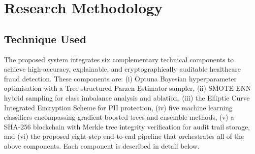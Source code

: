 \section{Research Methodology}

\subsection{Technique Used}

The proposed system integrates six complementary technical components to achieve
high-accuracy, explainable, and cryptographically auditable healthcare fraud
detection. These components are: (i) Optuna Bayesian hyperparameter optimisation
with a Tree-structured Parzen Estimator sampler, (ii) SMOTE-ENN hybrid sampling
for class imbalance analysis and ablation, (iii) the Elliptic Curve Integrated
Encryption Scheme for PII protection, (iv) five machine learning classifiers
encompassing gradient-boosted trees and ensemble methods, (v) a SHA-256 blockchain
with Merkle tree integrity verification for audit trail storage, and (vi) the
proposed eight-step end-to-end pipeline that orchestrates all of the above
components. Each component is described in detail below.

